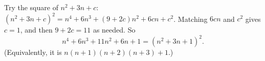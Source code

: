 Try the square of $n^2+3n+c$: $(n^2+3n+c)^2=n^4+6n^3+(9+2c)n^2+6cn+c^2$. Matching $6cn$ and $c^2$ gives $c=1$, and then $9+2c=11$ as needed. So
\[
n^4+6n^3+11n^2+6n+1=\boxed{(n^2+3n+1)^2}.
\]
(Equivalently, it is $n(n+1)(n+2)(n+3)+1$.)
